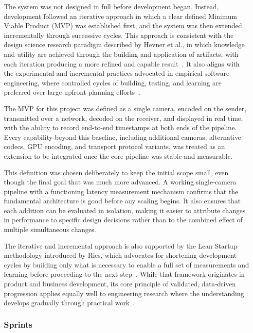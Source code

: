 The system was not designed in full before development began. Instead, development followed an iterative approach in which a clear defined Minimum Viable Product (MVP) was established first, and the system was then extended incrementally through successive cycles. This approach is consistent with the design science research paradigm described by Hevner et al., in which knowledge and utility are achieved through the building and application of artifacts, with each iteration producing a more refined and capable result~\cite{hevner2004}. It also aligns with the experimental and incremental practices advocated in empirical software engineering, where controlled cycles of building, testing, and learning are preferred over large upfront planning efforts~\cite{wohlin2012}.

The MVP for this project was defined as a single camera, encoded on the sender, transmitted over a network, decoded on the receiver, and displayed in real time, with the ability to record end-to-end timestamps at both ends of the pipeline. Every capability beyond this baseline, including additional cameras, alternative codecs, GPU encoding, and transport protocol variants, was treated as an extension to be integrated once the core pipeline was stable and measurable.

This definition was chosen deliberately to keep the initial scope small, even though the final goal that was much more advanced. A working single-camera pipeline with a functioning latency measurement mechanism confirms that the fundamental architecture is good before any scaling begins. It also ensures that each addition can be evaluated in isolation, making it easier to attribute changes in performance to specific design decisions rather than to the combined effect of multiple simultaneous changes.

The iterative and incremental approach is also supported by the Lean Startup methodology introduced by Ries, which advocates for shortening development cycles by building only what is necessary to enable a full set of measurements and learning before proceeding to the next step~\cite{ries2011}. While that framework originates in product and business development, its core principle of validated, data-driven progression applies equally well to engineering research where the understanding develops gradually through practical work~\cite{saunders2019}.

\subsubsection{Sprints}

